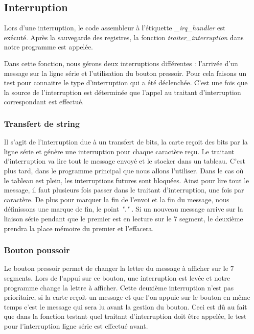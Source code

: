 \documentclass[a4paper, 10pt]{article}
\begin{document}
\subsection{Interruption}

Lors d'une interruption, le code assembleur à l'étiquette \textit{\_irq\_handler} est exécuté. Après la sauvegarde des registres, la fonction \textit{traiter\_interruption} dans notre programme est appelée.

Dans cette fonction, nous gérons deux interruptions différentes : l'arrivée d'un message sur la ligne série et l'utilisation du bouton pressoir. Pour cela faisons un test pour connaitre le type d'interruption qui a été déclenchée. C'est une fois que la source de l'interruption est déterminée que l'appel au traitant d'interruption correspondant est effectué.

\subsubsection{Transfert de string}

Il s'agit de l'interruption due à un transfert de bits, la carte reçoit des bits par la ligne série et génère une interruption pour chaque caractère reçu. Le traitant d'interruption va lire tout le message envoyé et le stocker dans un tableau. C'est plus tard, dans le programme principal que nous allons l'utiliser. Dans le cas où le tableau est plein, les interruptions futures sont bloquées. Ainsi pour lire tout le message, il faut plusieurs fois passer dans le traitant d'interruption, une fois par caractère. De plus pour marquer la fin de l'envoi et la fin du message, nous définissons une marque de fin, le point \textit{"."} . Si un nouveau message arrive sur la liaison série pendant que le premier est en lecture sur le 7 segment, le deuxième prendra la place mémoire du premier et l'effacera.

\subsubsection{Bouton poussoir}

Le bouton pressoir permet de changer la lettre du message à afficher sur le 7 segments. Lors de l'appui sur ce bouton, une interruption est levée et notre programme change la lettre à afficher. Cette deuxième interruption n'est pas prioritaire, si la carte reçoit un message et que l'on appuie sur le bouton en même temps c'est le message qui sera lu avant la gestion du bouton. Ceci est dû au fait que dans la fonction testant quel traitant d'interruption doit être appelée, le test pour l'interruption ligne série est effectué avant.
\end{document}
